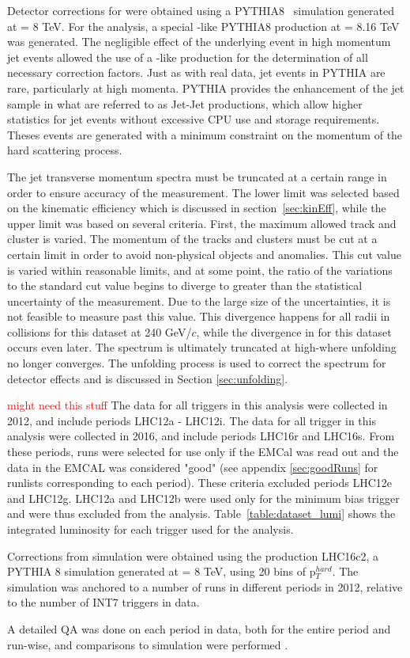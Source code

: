 Detector corrections for \pp were obtained using a PYTHIA8~\cite{SJOSTRAND2015159} simulation generated at \s = 8 TeV. For the \pPb analysis, a special \pp-like PYTHIA8 production at \s = 8.16 TeV was generated. The negligible effect of the underlying \pPb event in high momentum jet events allowed the use of a \pp-like production for the determination of all necessary correction factors. Just as with real data, jet events in PYTHIA are rare, particularly at high momenta. PYTHIA provides the enhancement of the jet sample in what are referred to as Jet-Jet productions, which allow higher statistics for jet events without excessive CPU use and storage requirements. Theses events are generated with a minimum constraint on the momentum \pTHard of the hard scattering process.

The jet transverse momentum spectra must be truncated at a certain \pT range in order to ensure accuracy of the measurement. The lower limit was selected based on the kinematic efficiency which is discussed in section~\ref{sec:kinEff}, while the upper limit was based on several criteria. First, the maximum allowed track and cluster \pT is varied. The momentum of the tracks and clusters must be cut at a certain limit in order to avoid non-physical objects and anomalies. This cut value is varied within reasonable limits, and at some point, the ratio of the variations to the standard cut value begins to diverge to greater than the statistical uncertainty of the measurement. Due to the large size of the uncertainties, it is not feasible to measure past this value. This divergence happens for all radii in \pp collisions for this dataset at 240 GeV/$c$, while the divergence in \pPb for this dataset occurs even later. The spectrum is ultimately truncated at high-\pT where unfolding no longer converges. The unfolding process is used to correct the spectrum for detector effects and is discussed in Section \ref{sec:unfolding}.

\textcolor{red}{might need this stuff}
The \pp data for all triggers in this analysis were collected in 2012, and include periods LHC12a - LHC12i. The \pPb data for all trigger in this analysis were collected in 2016, and include periods LHC16r and LHC16s. From these periods, runs were selected for use only if the EMCal was read out and the data in the EMCAL was considered "good" (see appendix \ref{sec:goodRuns} for runlists corresponding to each period). These criteria excluded periods LHC12e and LHC12g. LHC12a and LHC12b were used only for the minimum bias trigger and were thus excluded from the analysis. Table~\ref{table:dataset_lumi} shows the integrated luminosity for each trigger used for the analysis.

Corrections from simulation were obtained using the production LHC16c2, a PYTHIA 8 simulation generated at \sNN = 8 TeV, using 20 bins of p$_T^{hard}$. The simulation was anchored to a number of runs in different periods in 2012, relative to the number of INT7 triggers in data.

A detailed QA was done on each period in data, both for the entire period and run-wise, and comparisons to simulation were performed \cite{JIRATicket}.